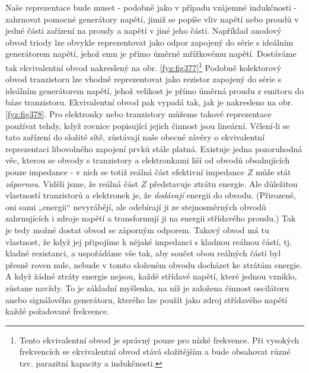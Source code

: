 {  Naše reprezentace bude muset - podobně jako v případu vzájemné indukčnosti - zahrnovat pomocné 
  generátory napětí, jimiž se popíše vliv napětí nebo proudů v jedné části zařízení na proudy a 
  napětí v jiné jeho části. Například anodový obvod triody lze obvykle reprezentovat jako odpor 
  zapojený do série s ideálním generátorem napětí, jehož emn je přímo úměrné mřížkovému napětí. 
  Dostáváme tak ekvivalentní obvod nakreslený na obr. \ref{fyz:fig377}\footnote{Tento ekvivalentní 
  obvod je správný pouze pro nízké frekvence. Při vysokých frekvencích se ekvivalentní obvod stává 
  složitějším a bude obsahovat různé tzv. parazitní kapacity a indukčnosti.} Podobně kolektorový 
  obvod tranzistoru lze vhodně reprezentovat jako rezistor zapojený do série s ideálním generátorem 
  napětí, jehož velikost je přímo úměrná proudu z emitoru do báze tranzistoru. Ekvivalentní
  obvod pak vypadá tak, jak je nakresleno na obr. \ref{fyz:fig378}. Pro elektronky nebo tranzistory 
  můžeme takové reprezentace používat tehdy, když rovnice popisující jejich činnost jsou lineární. 
  Včlení-li se tato zařízení do složité sítě, zůstávají naše obecné závěry o ekvivalentní 
  reprezentaci libovolného zapojení prvků stále platná. Existuje jedna pozoruhodná věc, kterou se 
  obvody s tranzistory a elektronkami liší od obvodů obsahujících pouze impedance - v nich se totiž 
  reálná část efektivní impedance \(Z\) může stát \emph{zápornou}. Viděli jsme, že reálná část 
  \(Z\) představuje ztrátu energie. Ale důležitou vlastností tranzistorů a elektronek je, že 
  \emph{dodávají} energii do obvodu. (Přirozeně, oni sami „energii“ nevyrábějí, ale odebírají ji ze 
  stejnosměrných obvodů zahrnujících i zdroje napětí a transformují ji na energii střídavého 
  proudu.) Tak je tedy možné dostat obvod se záporným odporem. Takový obvod má tu vlastnost, že 
  když jej připojíme k nějaké impedanci s kladnou reálnou částí, tj. kladné rezistanci, a 
  uspořádáme vše tak, aby součet obou reálných částí byl přesně roven nule, nebude v tomto složeném 
  obvodu docházet ke ztrátám energie. A když žádné ztráty energie nejsou, každé střídavé napětí, 
  které jednou vzniklo, zůstane navždy. To je základní myšlenka, na níž je založena činnost 
  oscilátoru anebo signálového generátoru, kterého lze použít jako zdroj střídavého napětí každé 
  požadované frekvence.
} %
\printbibliography[title={Seznam literatury}, heading=subbibliography]
